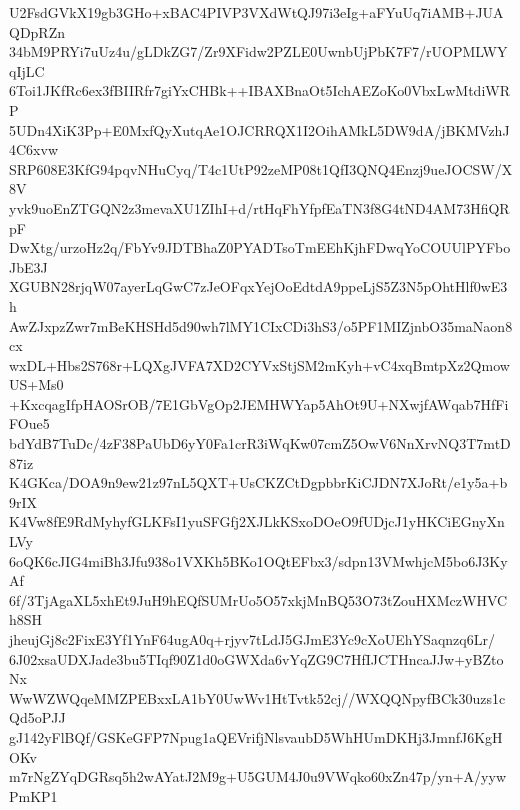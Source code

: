 U2FsdGVkX19gb3GHo+xBAC4PIVP3VXdWtQJ97i3eIg+aFYuUq7iAMB+JUAQDpRZn
34bM9PRYi7uUz4u/gLDkZG7/Zr9XFidw2PZLE0UwnbUjPbK7F7/rUOPMLWYqIjLC
6Toi1JKfRc6ex3fBIIRfr7giYxCHBk++IBAXBnaOt5IchAEZoKo0VbxLwMtdiWRP
5UDn4XiK3Pp+E0MxfQyXutqAe1OJCRRQX1I2OihAMkL5DW9dA/jBKMVzhJ4C6xvw
SRP608E3KfG94pqvNHuCyq/T4c1UtP92zeMP08t1QfI3QNQ4Enzj9ueJOCSW/X8V
yvk9uoEnZTGQN2z3mevaXU1ZIhI+d/rtHqFhYfpfEaTN3f8G4tND4AM73HfiQRpF
DwXtg/urzoHz2q/FbYv9JDTBhaZ0PYADTsoTmEEhKjhFDwqYoCOUUlPYFboJbE3J
XGUBN28rjqW07ayerLqGwC7zJeOFqxYejOoEdtdA9ppeLjS5Z3N5pOhtHlf0wE3h
AwZJxpzZwr7mBeKHSHd5d90wh7lMY1CIxCDi3hS3/o5PF1MIZjnbO35maNaon8cx
wxDL+Hbs2S768r+LQXgJVFA7XD2CYVxStjSM2mKyh+vC4xqBmtpXz2QmowUS+Ms0
+KxcqagIfpHAOSrOB/7E1GbVgOp2JEMHWYap5AhOt9U+NXwjfAWqab7HfFiFOue5
bdYdB7TuDc/4zF38PaUbD6yY0Fa1crR3iWqKw07cmZ5OwV6NnXrvNQ3T7mtD87iz
K4GKca/DOA9n9ew21z97nL5QXT+UsCKZCtDgpbbrKiCJDN7XJoRt/e1y5a+b9rIX
K4Vw8fE9RdMyhyfGLKFsI1yuSFGfj2XJLkKSxoDOeO9fUDjcJ1yHKCiEGnyXnLVy
6oQK6cJIG4miBh3Jfu938o1VXKh5BKo1OQtEFbx3/sdpn13VMwhjcM5bo6J3KyAf
6f/3TjAgaXL5xhEt9JuH9hEQfSUMrUo5O57xkjMnBQ53O73tZouHXMczWHVCh8SH
jheujGj8c2FixE3Yf1YnF64ugA0q+rjyv7tLdJ5GJmE3Yc9cXoUEhYSaqnzq6Lr/
6J02xsaUDXJade3bu5TIqf90Z1d0oGWXda6vYqZG9C7HfIJCTHncaJJw+yBZtoNx
WwWZWQqeMMZPEBxxLA1bY0UwWv1HtTvtk52cj//WXQQNpyfBCk30uzs1cQd5oPJJ
gJ142yFlBQf/GSKeGFP7Npug1aQEVrifjNlsvaubD5WhHUmDKHj3JmnfJ6KgHOKv
m7rNgZYqDGRsq5h2wAYatJ2M9g+U5GUM4J0u9VWqko60xZn47p/yn+A/yywPmKP1
